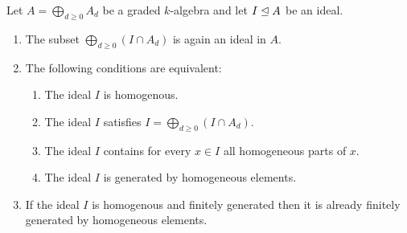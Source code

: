 \begin{lemma}
  \label{lemma: characterization of homogeneous ideals via homogeneous generators}
  Let $A = \bigoplus_{d \geq 0} A_d$ be a graded $k$-algebra and let $I \trianglelefteq A$ be an ideal.
  \begin{enumerate}
    \item
      \label{enumerate: intersection is again a graded ideal}
      The subset $\bigoplus_{d \geq 0} (I \cap A_d)$ is again an ideal in $A$.
    \item
      The following conditions are equivalent:
      \begin{enumerate}
        \item
          \label{enumerate: ideal is homogeneous}
          The ideal $I$ is homogenous.
        \item
          \label{enumerate: ideal has decomposition}
          The ideal $I$ satisfies $I = \bigoplus_{d \geq 0} (I \cap A_d)$.
        \item
          \label{enumerate: ideal contains homogenous parts}
          The ideal $I$ contains for every $x \in I$ all homogeneous parts of $x$.
        \item
          \label{enumerate: ideal is generated by homogeneous}
          The ideal $I$ is generated by homogeneous elements.
      \end{enumerate}
    \item
      If the ideal $I$ is homogenous and finitely generated then it is already finitely generated by homogeneous elements.
  \end{enumerate}
\end{lemma}



